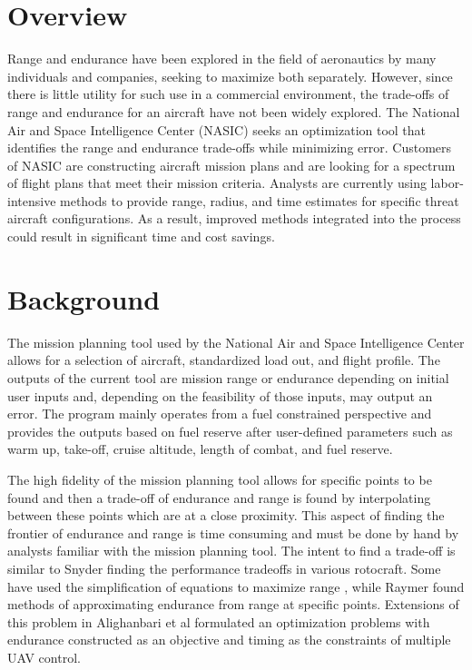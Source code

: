 \section{Overview}
\hspace{.5cm} Range and endurance have been explored in the field of aeronautics by many individuals and companies, seeking to maximize both separately. However, since there is little utility for such use in a commercial environment, the trade-offs of range and endurance for an aircraft have not been widely explored. The National Air and Space Intelligence Center (NASIC) seeks an optimization tool that identifies the range and endurance trade-offs while minimizing error. Customers of NASIC are constructing aircraft mission plans and are looking for a spectrum of flight plans that meet their mission criteria. Analysts are currently using labor-intensive methods to provide range, radius, and time estimates for specific threat aircraft configurations. As a result, improved methods integrated into the process could result in significant time and cost savings. 

\section{Background}

\hspace{.5cm}The mission planning tool used by the National Air and Space Intelligence Center allows for a selection of aircraft, standardized load out, and flight profile. The outputs of the current tool are mission range or endurance depending on initial user inputs and, depending on the feasibility of those inputs, may output an error. The program mainly operates from a fuel constrained perspective and provides the outputs based on fuel reserve after user-defined parameters such as warm up, take-off, cruise altitude, length of combat, and fuel reserve. \par
The high fidelity of the mission planning tool allows for specific points to be found and then a trade-off of endurance and range is found by interpolating between these points which are at a close proximity. This aspect of finding the frontier of endurance and range is time consuming and must be done by hand by analysts familiar with the mission planning tool. The intent to find a trade-off is similar to Snyder \cite{Tradeoffs} finding the performance tradeoffs in various rotocraft. Some have used the simplification of equations to maximize range \cite{breguetRangeEqn, OptimizeBreguet}, while Raymer \cite{LoiterTimeFromRange} found methods of approximating endurance from range at specific points. Extensions of this problem in Alighanbari et al \cite{Alighanbari} formulated an optimization problems with endurance constructed as an objective and timing as the constraints of multiple UAV control. 

